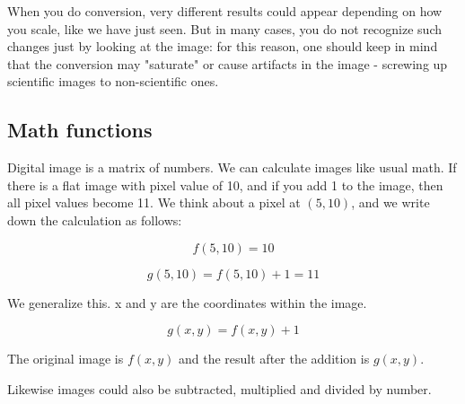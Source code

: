 When you do conversion, very different results could appear depending on
how you scale, like we have just seen. But in many cases, you do not
recognize such changes just by looking at the image: for this reason,
one should keep in mind that the conversion may
"saturate" or cause artifacts in the image
- screwing up scientific images to non-scientific ones. 


\subsection{Math functions}

Digital image is a matrix of numbers. We can calculate images like usual
math. If there is a flat image with pixel value of 10, and if you add 1
to the image, then all pixel values become 11. We think about a pixel
at $(5, 10)$, and we write down the calculation as follows:

\begin{equation}
f(5, 10) = 10
\end{equation}

\begin{equation}
g(5,10) = f (5, 10) +1 = 11
\end{equation}

We generalize this. x and y are the coordinates within the image.

\begin{equation}
g( x , y ) = f (x, y) + 1
\end{equation}

The original image is $f(x, y)$ and the result after the addition
is $g(x, y)$. 

Likewise images could also be subtracted, multiplied and divided by
number. 


